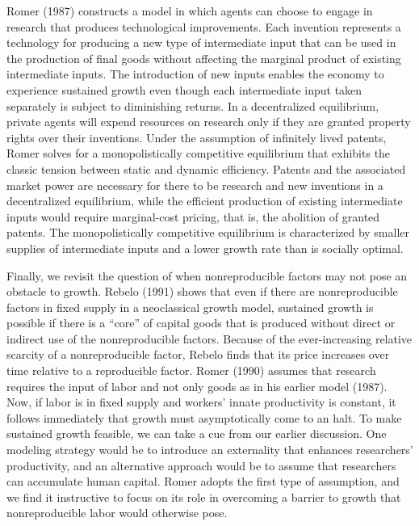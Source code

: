 Romer (1987) constructs a model in which agents can choose to engage
in research that produces technological improvements.
Each invention represents a technology for
producing a new type of intermediate input that can be used in
the production of final goods without affecting the marginal product
of existing intermediate inputs. The introduction of new inputs
enables the economy to experience sustained growth even though each
intermediate
input taken separately is subject to diminishing returns.
In a decentralized equilibrium, private agents will expend
resources on research  only if they are granted property rights over
their inventions. Under the assumption of infinitely lived patents,
Romer solves for a monopolistically competitive equilibrium that
exhibits the classic tension between static and dynamic
efficiency. Patents and the associated market power are necessary for
there to be research and new inventions in a decentralized equilibrium,
while the efficient production of existing intermediate inputs would
require marginal-cost pricing, that is, the abolition of granted
patents. The monopolistically competitive equilibrium is characterized
by  smaller
supplies of  intermediate inputs and a lower growth rate than is
socially optimal.

Finally, we revisit the question of when nonreproducible factors may not
pose an obstacle to growth. Rebelo (1991)
%
shows that even if there are nonreproducible factors in fixed supply in
a neoclassical growth model, sustained growth is possible if there is
a ``core'' of capital goods that is produced without  direct or
indirect use of the nonreproducible factors.  Because of
the ever-increasing relative scarcity of a nonreproducible factor,
Rebelo finds that its price increases over time relative to a
reproducible factor.
Romer (1990) assumes that research requires the input of labor
and not only goods as in his earlier model (1987). Now, if labor is in fixed
supply and workers' innate productivity is constant, it follows immediately
that growth must asymptotically come to an halt.  To make sustained growth
feasible, we can take a cue from our earlier discussion.
One modeling strategy would be to introduce an externality that enhances
researchers' productivity, and an alternative approach would be to assume
that researchers can accumulate human capital. Romer adopts the first type
of assumption, and we find it instructive to focus
on its role in overcoming a barrier to growth that nonreproducible labor
would otherwise pose.

